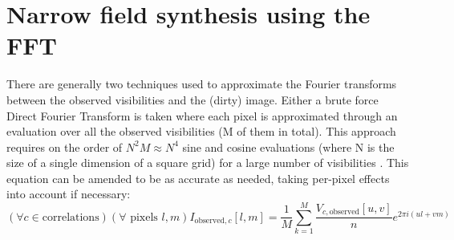 \section{Narrow field synthesis using the FFT}
 There are generally two techniques used to approximate the Fourier transforms between the observed visibilities and the (dirty) image. Either a brute force Direct Fourier Transform is taken where each pixel is approximated through an
 evaluation over all the observed visibilities (M of them in total). This approach requires on the order of $N^2M \approx N^4$ sine and cosine evaluations (where N is the size of a single dimension of a square grid) for a large 
 number of visibilities \cite[Lecture 7]{taylor1999synthesis}. This equation can be amended to be as accurate as needed, taking per-pixel effects into 
 account if necessary:
 \begin{equation}
  (\forall c\in\text{correlations})(\forall\text{ pixels }l,m) I_{\text{observed},c}[l,m] = \frac{1}{M}\sum_{k=1}^{M}{\frac{V_{c,\text{observed}}[u,v]}{n}e^{2\pi i (ul + vm)}}
 \end{equation} 
 
